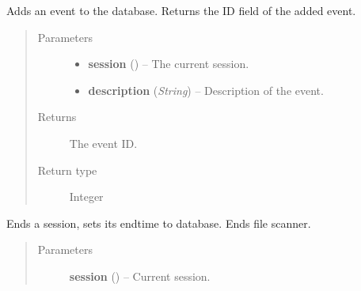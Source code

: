 \documentclass[letterpaper,10pt,english]{sphinxmanual}
\begin{document}
\begin{fulllineitems}
\label{controller:controller.session.add_event}
Adds an event to the database.
Returns the ID field of the added event.
\begin{quote}\begin{description}
\item[{Parameters}] \leavevmode\begin{itemize}
\item {} 
\textbf{session} ({\hyperref[models:models.Session]{}}) -- The current session.

\item {} 
\textbf{description} (\emph{String}) -- Description of the event.

\end{itemize}

\item[{Returns}] \leavevmode
The event ID.

\item[{Return type}] \leavevmode
Integer

\end{description}\end{quote}

\end{fulllineitems}


\begin{fulllineitems}
\label{controller:controller.session.end_session}
Ends a session, sets its endtime to database.
Ends file scanner.
\begin{quote}\begin{description}
\item[{Parameters}] \leavevmode
\textbf{session} ({\hyperref[models:models.Session]{}}) -- Current session.

\end{description}\end{quote}

\end{fulllineitems}

\end{document}
